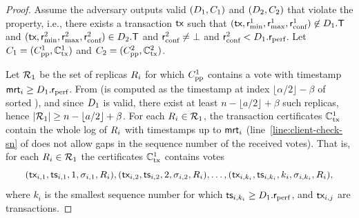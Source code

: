 \begin{proof}
	Assume the adversary outputs valid $(D_1, C_1)$ and $(D_2, C_2)$ that violate the property,
	i.e., there exists a transaction $\textsf{tx}$ such that $(\textsf{tx}, \textsf{r}_\text{min}^1, \textsf{r}_\text{max}^1, \textsf{r}_\text{conf}^1) \not\in D_1.\textsf{T}$ and $(\textsf{tx}, \textsf{r}_\text{min}^2, \textsf{r}_\text{max}^2, \textsf{r}_\text{conf}^2) \in D_2.\textsf{T}$ and $\textsf{r}_\text{conf}^2 \neq \bot$ and $\textsf{r}_\text{conf}^2 < D_1.\textsf{r}_\text{perf}$.
	Let $C_1 = (C_\text{pp}^1, \mathbb{C}_\text{tx}^1)$ and $C_2 = (C_\text{pp}^2, \mathbb{C}_\text{tx}^2)$.

	Let $\mathcal{R}_1$ be the set of replicas $R_i$ for which $C_\text{pp}^1$ contains a vote with timestamp $\textsf{mrt}_i \geq D_1.\textsf{r}_\text{perf}$.
	From  (\rperf is computed as the timestamp at index $\lfloor \alpha / 2 \rfloor - \beta$ of sorted \mrt), and since $D_1$ is valid, there exist at least $n - \lfloor a/2 \rfloor + \beta$ such replicas, hence $|\allreps_1| \geq n - \lfloor a/2 \rfloor + \beta$.
	For each $R_i \in \mathcal{R}_1$, the transaction certificates $\mathbb{C}_\text{tx}^1$ contain the whole log of $R_i$ with timestamps up to $\textsf{mrt}_i$ (line~\ref{line:client-check-sn} of  does not allow gaps in the sequence number of the received votes).
	That is, for each $R_i \in \mathcal{R}_1$ the certificates $\mathbb{C}_\text{tx}^1$ contains votes
	\begin{equation}\label{eq:proof-pp-set1}
		(\textsf{tx}_{i,1}, \textsf{ts}_{i,1}, 1, \sigma_{i,1}, R_i), (\textsf{tx}_{i,2}, \textsf{ts}_{i,2}, 2, \sigma_{i,2}, R_i), \ldots, (\textsf{tx}_{i,k_i}, \textsf{ts}_{i, k_i}, k_i, \sigma_{i, k_i}, R_i),
	\end{equation}
	where $k_i$ is the smallest sequence number for which $\textsf{ts}_{i, k_i} \geq D_1.\textsf{r}_\text{perf}$, and $\textsf{tx}_{i,j}$ are transactions.


\end{proof}
